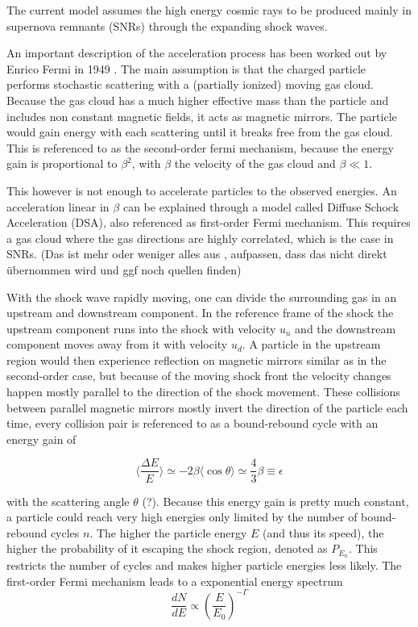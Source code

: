 The current model assumes the high energy cosmic rays to be produced 
mainly in supernova remnants (SNRs) through the expanding shock waves.

An important description of the acceleration process has been
worked out by Enrico Fermi in 1949 \cite{PhysRev.75.1169}.
The main assumption is that the charged particle performs 
stochastic scattering with a (partially ionized) moving gas cloud.
Because the gas cloud has a much higher effective mass than the particle and
includes non constant magnetic fields, it acts as magnetic mirrors.
The particle would gain energy with each scattering until it breaks free from the 
gas cloud. This is referenced to as the second-order fermi mechanism, 
because the energy gain is proportional to $\beta^2$, with $\beta$
the velocity of the gas cloud and $\beta \ll 1$.

This however is not enough to accelerate particles to the observed energies.
An acceleration linear in $\beta$ can be explained through a model called
Diffuse Schock Acceleration (DSA), also referenced as first-order
Fermi mechanism.
This requires a gas cloud where the gas directions are highly correlated,
which is the case in SNRs.
(Das ist mehr oder weniger alles aus \cite{bookap}, 
aufpassen, dass das nicht direkt übernommen wird und ggf noch quellen finden)

With the shock wave rapidly moving, one can divide the surrounding gas in 
an upstream and downstream component. In the reference frame of the shock
the upstream component runs into the shock with 
velocity $u_u$ and the downstream component moves away from 
it with velocity $u_d$.
A particle in the upstream region would then experience reflection on 
magnetic mirrors similar as in the second-order case, but because of the 
moving shock front the velocity changes happen mostly 
parallel to the direction of the shock movement.
These collisions between parallel magnetic mirrors mostly
invert the direction of the particle each time, every collision pair 
is referenced to as a bound-rebound cycle with an energy gain of 

\begin{equation}
	\langle \frac{\Delta E}{E} \rangle 
	\simeq -2\beta \langle \cos{\theta} \rangle
	\simeq \frac{4}{3}\beta
	\equiv \epsilon
\end{equation}

with the scattering angle $\theta$ (?).
Because this energy gain is pretty much constant, a particle could reach very high 
energies only limited by the number of bound-rebound cycles $n$.
The higher the particle energy $E$ (and thus its speed), 
the higher the probability of it escaping the shock region, denoted 
as $P_{E_n}$.
This restricts the number of cycles and makes higher particle energies 
less likely.
The first-order Fermi mechanism leads to a exponential energy spectrum 
\begin{equation}
	\frac{dN}{dE} \propto \left(\frac{E}{E_0}\right)^{-\Gamma}
\end{equation}

